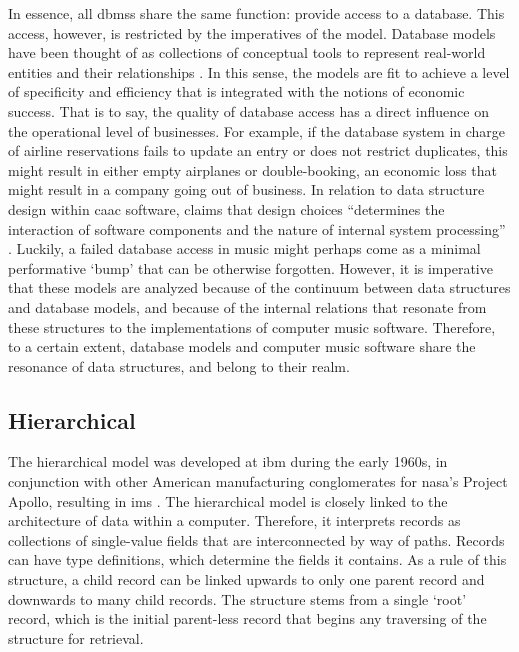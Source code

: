 In essence, all \gls{dbms}s share the same function: provide access to a database. This access, however, is restricted by the imperatives of the model. Database models have been thought of as collections of conceptual tools to represent real-world entities and their relationships \parencite[1]{2008:graph/anglesgutierrez/survey}. In this sense, the models are fit to achieve a level of specificity and efficiency that is integrated with the notions of economic success. That is to say, the quality of database access has a direct influence on the operational level of businesses. For example, if the database system in charge of airline reservations fails to update an entry or does not restrict duplicates, this might result in either empty airplanes or double-booking, an economic loss that might result in a company going out of business. In relation to data structure design within \gls{caac} software, \textcite{Ari05:Ano} claims that design choices ``determines the interaction of software components and the nature of internal system processing'' \parencite[18]{Ari05:Ano}. Luckily, a failed database access in music might perhaps come as a minimal performative `bump' that can be otherwise forgotten. However, it is imperative that these models are analyzed because of the continuum between data structures and database models, and because of the internal relations that resonate from these structures to the implementations of computer music software. Therefore, to a certain extent, database models and computer music software share the resonance of data structures, and belong to their realm.

% 
% 




\subsection{Hierarchical}
\label{model:hierarchical}


The hierarchical model was developed at \gls{ibm} during the early 1960s, in conjunction with other American manufacturing conglomerates for \gls{nasa}'s Project Apollo, resulting in \gls{ims} \parencite{2000-database-ims}. The hierarchical model is closely linked to the architecture of data within a computer. Therefore, it interprets records as collections of single-value fields that are interconnected by way of paths. Records can have type definitions, which determine the fields it contains. As a rule of this structure, a child record can be linked upwards to only one parent record and downwards to many child records. The structure stems from a single `root' record, which is the initial parent-less record that begins any traversing of the structure for retrieval.

